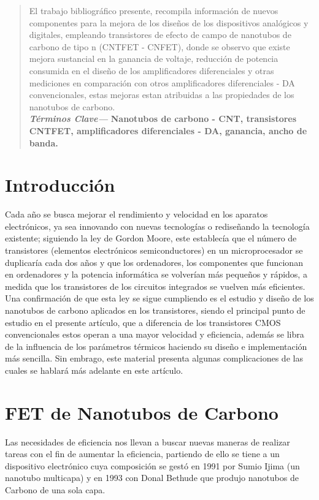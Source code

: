 \documentclass[conference]{IEEEtran} %
\providecommand{\keywords}[1]{\textbf{\textit{Términos Clave---}} #1}
\begin{document}
\begin{abstract}
	El trabajo bibliográfico presente, recompila información de nuevos componentes para la mejora 
	de los diseños de los dispositivos analógicos y digitales, empleando transistores de efecto de campo de nanotubos de carbono de tipo n (CNTFET - CNFET), donde se observo que existe mejora sustancial en la ganancia de voltaje, reducción de potencia consumida 
	en el diseño de los amplificadores diferenciales
	y otras mediciones en comparación con otros amplificadores diferenciales - DA convencionales, estas mejoras estan atribuidas a las propiedades de los nanotubos de carbono.\\
	
	\keywords{\textbf{Nanotubos de carbono - CNT, transistores CNTFET, amplificadores diferenciales - DA, ganancia, ancho de banda.}}
\end{abstract}

\section{Introducción}

Cada año se busca mejorar el rendimiento y velocidad en los aparatos electrónicos, ya sea innovando con nuevas tecnologías o rediseñando la tecnología existente; siguiendo la ley de Gordon Moore, este establecía que el número de transistores (elementos electrónicos semiconductores) en un microprocesador se duplicaría cada dos años y que los ordenadores, los componentes que funcionan en ordenadores y la potencia informática se volverían más pequeños y rápidos, a medida que los transistores de los circuitos integrados se vuelven más eficientes.
Una confirmación de que esta ley se sigue cumpliendo es el estudio y diseño de los nanotubos de carbono aplicados en los transistores, siendo el principal punto de estudio en el presente artículo, que a diferencia de los transistores CMOS convencionales estos operan a una mayor velocidad y eficiencia, además se libra de la influencia de los parámetros térmicos haciendo su diseño e implementación más sencilla. Sin embrago, este material presenta algunas complicaciones de las cuales se hablará más adelante en este artículo.


\section{FET de Nanotubos de Carbono}
Las necesidades de eficiencia nos llevan a buscar nuevas maneras de realizar tareas con el fin de aumentar la eficiencia, partiendo de ello se tiene a un dispositivo electrónico cuya composición se gestó en 1991 por Sumio Ijima (un nanotubo multicapa) y en 1993 con Donal Bethude que produjo nanotubos de Carbono de una sola capa.
\end{document}
